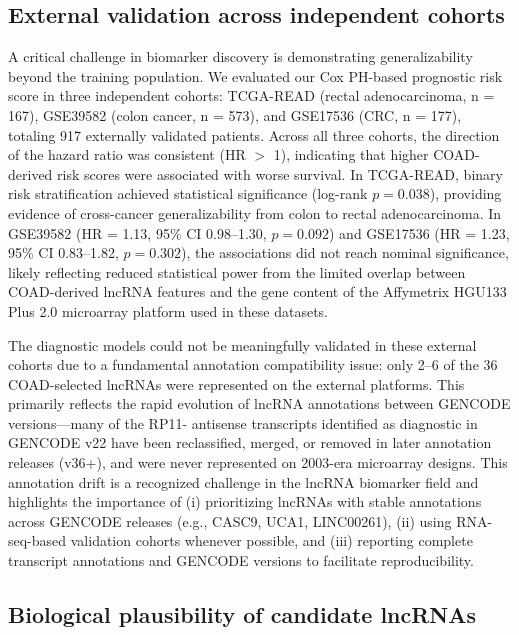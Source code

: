 \documentclass[fleqn,10pt]{wlscirep}
\begin{document}
\subsection*{External validation across independent cohorts}

A critical challenge in biomarker discovery is demonstrating generalizability beyond the training population. We evaluated our Cox PH-based prognostic risk score in three independent cohorts: TCGA-READ (rectal adenocarcinoma, n = 167), GSE39582 (colon cancer, n = 573), and GSE17536 (CRC, n = 177), totaling 917 externally validated patients. Across all three cohorts, the direction of the hazard ratio was consistent (HR $>$ 1), indicating that higher COAD-derived risk scores were associated with worse survival. In TCGA-READ, binary risk stratification achieved statistical significance (log-rank $p = 0.038$), providing evidence of cross-cancer generalizability from colon to rectal adenocarcinoma. In GSE39582 (HR = 1.13, 95\% CI 0.98–1.30, $p = 0.092$) and GSE17536 (HR = 1.23, 95\% CI 0.83–1.82, $p = 0.302$), the associations did not reach nominal significance, likely reflecting reduced statistical power from the limited overlap between COAD-derived lncRNA features and the gene content of the Affymetrix HGU133 Plus 2.0 microarray platform used in these datasets.

The diagnostic models could not be meaningfully validated in these external cohorts due to a fundamental annotation compatibility issue: only 2–6 of the 36 COAD-selected lncRNAs were represented on the external platforms. This primarily reflects the rapid evolution of lncRNA annotations between GENCODE versions—many of the RP11- antisense transcripts identified as diagnostic in GENCODE v22 have been reclassified, merged, or removed in later annotation releases (v36+), and were never represented on 2003-era microarray designs. This annotation drift is a recognized challenge in the lncRNA biomarker field and highlights the importance of (i) prioritizing lncRNAs with stable annotations across GENCODE releases (e.g., CASC9, UCA1, LINC00261), (ii) using RNA-seq-based validation cohorts whenever possible, and (iii) reporting complete transcript annotations and GENCODE versions to facilitate reproducibility\cite{RN12}.

\subsection*{Biological plausibility of candidate lncRNAs}
\end{document}
